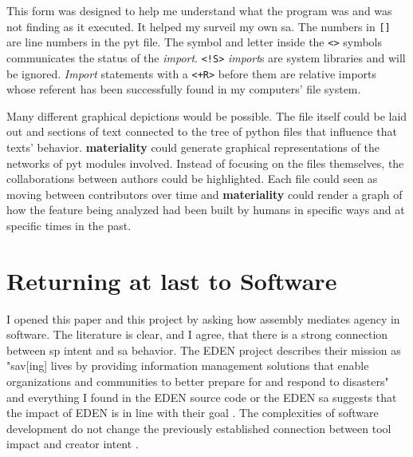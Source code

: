 \documentclass[a4paper,man,natbib,floatsintext]{apa6}
\begin{document}
  This form was designed to help me understand what the program was and was not finding as it executed. It helped my surveil my own \gls{sa}. The numbers in \verb|[]| are line numbers in the \Gls{pyt} file. The symbol and letter inside the \verb|<>| symbols communicates the status of the \textit{import}. \verb|<!S>| \textit{import}s are system libraries and will be ignored. \textit{Import} statements with a \verb|<+R>| before them are relative imports whose referent has been successfully found in my computers' file system\footnotemark. 


  Many different graphical depictions would be possible. The file itself could be laid out and sections of text connected to the tree of python files that influence that texts' behavior. \textbf{materiality} could generate graphical representations of the networks of \Gls{pyt} modules involved. Instead of focusing on the files themselves, the collaborations between authors could be highlighted. Each file could seen as moving between contributors over time and \textbf{materiality} could render a graph of how the feature being analyzed had been built by humans in specific ways and at specific times in the past.
  \newpage

  \section{Returning at last to Software}
  I opened this paper and this project by asking how assembly mediates agency in software. The literature is clear, and I agree, that there is a strong connection between \gls{sp} intent and \gls{sa} behavior. The \gls{EDEN} project describes their mission as "sav[ing] lives by providing information management solutions that enable organizations and communities to better prepare for and respond to disasters" and everything I found in the \gls{EDEN} source code or the \gls{EDEN} \gls{sa} suggests that the impact of \gls{EDEN} is in line with their goal \citep{Sahana_Foundation_undated-hl}. The complexities of software development do not change the previously established connection between tool impact and creator intent \citet{Subramaniam2014-wg}. 
\end{document}
